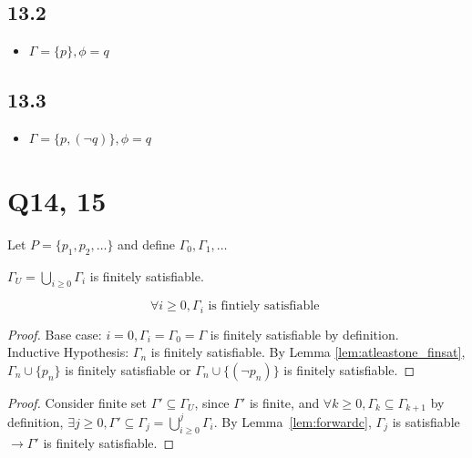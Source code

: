 \documentclass{article}
\newtheorem{lemma}[theorem]{Lemma}
\let\oldlemma\lemma
\let\endoldlemma\endlemma
\renewenvironment{lemma}
  {\begin{tcolorbox}[
      colback=green!8,
      colframe=green!50!black,
      boxrule=0.6pt,
      arc=2pt,
      left=6pt,right=6pt,top=4pt,bottom=4pt
    ]\oldlemma}
  {\endoldlemma\end{tcolorbox}}
\begin{document}
\subsection*{13.2}
\begin{itemize}
    \item $\Gamma = \{p\}, \phi = q$
\end{itemize}
\subsection*{13.3}
\begin{itemize}
    \item $\Gamma = \{p, (\neg q)\}, \phi = q$
\end{itemize}
\section*{Q14, 15}
Let $P=\{p_1,p_2,\dots\}$ and define $\Gamma_0,\Gamma_1,\dots$
\begin{lemma}\label{lem:unionfinsat}
    $\Gamma_U=\bigcup_{i\ge0}\Gamma_i$ is finitely satisfiable.
\end{lemma}
\begin{lemma}
    \[\forall i \geq 0, \Gamma_i \text{ is fintiely satisfiable }\] 
\end{lemma}
\begin{proof}
    Base case: $i=0,\Gamma_i = \Gamma_0 = \Gamma$ is finitely satisfiable by definition.\\
    Inductive Hypothesis: $\Gamma_n $ is finitely satisfiable. By Lemma \ref{lem:atleastone_finsat}, 
    $\Gamma_n \cup \{p_n\}$ is finitely satisfiable or $\Gamma_n \cup \{(\neg p_n)\}$ is finitely satisfiable.
\end{proof}

\begin{proof}
    Consider finite set $\Gamma' \subseteq \Gamma_U$, since $\Gamma'$ is finite, and $\forall k\geq 0, \Gamma_k \subseteq \Gamma_{k+1}$ by definition,
    $\exists j \geq 0, \Gamma' \subseteq \Gamma_j = \bigcup_{i\geq 0}^j \Gamma_i$. By Lemma~\ref{lem:forwardc}, $\Gamma_j$ is satisfiable $\rightarrow \Gamma'$ is finitely satisfiable.
\end{proof}
\end{document}

